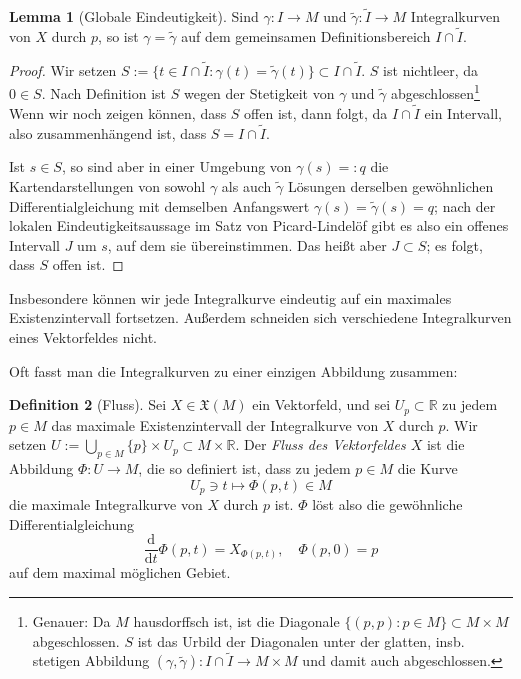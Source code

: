 \documentclass[a4paper]{scrreprt}
\numberwithin{equation}{chapter}
\newcommand{\D}{\mathrm{d}}
\newcommand{\R}{\mathbb{R}}
\theoremstyle{definition}
\newtheorem{defn}{Definition}[section]
\newtheorem{lemma}[defn]{Lemma}
\newcommand{\kommB}[2][noinline]{\todo[#1,color=blue!20]{#2}}
\begin{document}
\begin{lemma}[Globale Eindeutigkeit]
	Sind $\gamma\colon I \to M$ und $\tilde\gamma\colon \tilde I \to M$ Integralkurven von $X$ durch $p$, so ist $\gamma = \tilde \gamma$ auf dem gemeinsamen Definitionsbereich $I \cap \tilde I$.

	\begin{proof}
		Wir setzen $S := \{t \in I \cap \tilde I: \gamma(t) = \tilde \gamma(t)\} \subset I \cap \tilde I$. $S$ ist nichtleer, da $0 \in S$. Nach Definition ist $S$ wegen der Stetigkeit von $\gamma$ und $\tilde \gamma$ abgeschlossen\footnote{Genauer: Da $M$ hausdorffsch ist, ist die Diagonale $\{(p,p) : p \in M\} \subset M \times M$ abgeschlossen. $S$ ist das Urbild der Diagonalen unter der glatten, insb. stetigen Abbildung $(\gamma,\tilde \gamma) \colon I \cap \tilde I \to M \times M$ und damit auch abgeschlossen.} Wenn wir noch zeigen können, dass $S$ offen ist, dann folgt, da $I \cap \tilde I$ ein Intervall, also zusammenhängend ist, dass $S = I \cap \tilde I$.

		Ist $s \in S$, so sind aber in einer Umgebung von $\gamma(s) =: q$ die Kartendarstellungen von sowohl $\gamma$ als auch $\tilde \gamma$ Lösungen derselben gewöhnlichen Differentialgleichung mit demselben Anfangswert $\gamma(s) = \tilde\gamma(s) = q$; nach der lokalen Eindeutigkeitsaussage im Satz von Picard-Lindelöf gibt es also ein offenes Intervall $J$ um $s$, auf dem sie übereinstimmen. Das heißt aber $J \subset S$; es folgt, dass $S$ offen ist.
	\end{proof}
\end{lemma}
Insbesondere können wir jede Integralkurve eindeutig auf ein maximales Existenzintervall fortsetzen. Außerdem schneiden sich verschiedene Integralkurven eines Vektorfeldes nicht.

Oft fasst man die Integralkurven zu einer einzigen Abbildung zusammen:
\begin{defn}[Fluss]
	Sei $X \in \mathfrak X(M)$ ein Vektorfeld, und sei $U_p \subset \R$ zu jedem $p \in M$ das maximale Existenzintervall der Integralkurve von $X$ durch $p$. Wir setzen $U := \bigcup_{p\in M} \{p\}\times U_p \subset M \times \R$. Der \emph{Fluss des Vektorfeldes $X$} ist die Abbildung $\Phi\colon U \to M$, die so definiert ist, dass zu jedem $p \in M$ die Kurve
	\[U_p \ni t \mapsto \Phi(p,t) \in M\] \kommB{Möchtest du das nicht lieber $I_p$ nennen?}
	die maximale Integralkurve von $X$ durch $p$ ist. $\Phi$ löst also die gewöhnliche Differentialgleichung
	\[\frac{\D}{\D t} \Phi(p,t) = X_{\Phi(p,t)}, \quad \Phi(p,0) = p\]
	auf dem maximal möglichen Gebiet.
\end{defn}
\end{document}
